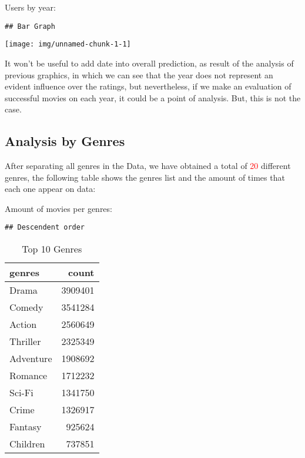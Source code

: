 \documentclass[]{article}
\begin{document}
Users by year:

\begin{verbatim}
## Bar Graph
\end{verbatim}

\begin{center}\texttt{[image: img/unnamed-chunk-1-1]} \end{center}

It won't be useful to add date into overall prediction, as result of the
analysis of previous graphics, in which we can see that the year does
not represent an evident influence over the ratings, but nevertheless,
if we make an evaluation of successful movies on each year, it could be
a point of analysis. But, this is not the case.

\hypertarget{analysis-by-genres}{%
\subsection{Analysis by Genres}\label{analysis-by-genres}}

After separating all genres in the Data, we have obtained a total of
\textcolor{red}{20} different genres, the following table shows the
genres list and the amount of times that each one appear on data:

Amount of movies per genres:

\begin{verbatim}
## Descendent order
\end{verbatim}

\begin{table}[!h]

\caption{\label{tab:genres.list}Top 10 Genres}
\centering
\begin{tabular}{lr}
\toprule
genres & count\\
\midrule
\rowcolor{gray!6}  Drama & 3909401\\
Comedy & 3541284\\
\rowcolor{gray!6}  Action & 2560649\\
Thriller & 2325349\\
\rowcolor{gray!6}  Adventure & 1908692\\
\addlinespace
Romance & 1712232\\
\rowcolor{gray!6}  Sci-Fi & 1341750\\
Crime & 1326917\\
\rowcolor{gray!6}  Fantasy & 925624\\
Children & 737851\\
\bottomrule
\end{tabular}
\end{table}
\end{document}
